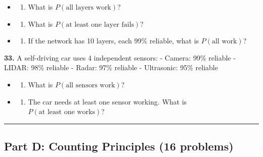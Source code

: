 \documentclass[
  11pt,
]{article}
\providecommand{\tightlist}{%
  \setlength{\itemsep}{0pt}\setlength{\parskip}{0pt}}
\begin{document}
\begin{itemize}
\item
  \begin{enumerate}
  \def\labelenumi{(\alph{enumi})}
  \tightlist
  \item
    What is \(P(\text{all layers work})\)?
  \end{enumerate}
\item
  \begin{enumerate}
  \def\labelenumi{(\alph{enumi})}
  \setcounter{enumi}{1}
  \tightlist
  \item
    What is \(P(\text{at least one layer fails})\)?
  \end{enumerate}
\item
  \begin{enumerate}
  \def\labelenumi{(\alph{enumi})}
  \setcounter{enumi}{2}
  \tightlist
  \item
    If the network has 10 layers, each 99\% reliable, what is
    \(P(\text{all work})\)?
  \end{enumerate}
\end{itemize}

\textbf{33.} A self-driving car uses 4 independent sensors: - Camera:
99\% reliable - LIDAR: 98\% reliable - Radar: 97\% reliable -
Ultrasonic: 95\% reliable

\begin{itemize}
\item
  \begin{enumerate}
  \def\labelenumi{(\alph{enumi})}
  \tightlist
  \item
    What is \(P(\text{all sensors work})\)?
  \end{enumerate}
\item
  \begin{enumerate}
  \def\labelenumi{(\alph{enumi})}
  \setcounter{enumi}{1}
  \tightlist
  \item
    The car needs at least one sensor working. What is
    \(P(\text{at least one works})\)?
  \end{enumerate}
\end{itemize}

\begin{center}\rule{0.5\linewidth}{0.5pt}\end{center}

\hypertarget{part-d-counting-principles-16-problems}{%
\subsection{Part D: Counting Principles (16
problems)}\label{part-d-counting-principles-16-problems}}
\end{document}
